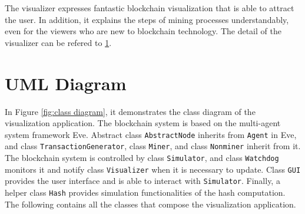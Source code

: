 The visualizer expresses fantastic blockchain visualization that is able to attract the user. In addition, it explains the steps of mining processes understandably, even for the viewers who are new to blockchain technology. The detail of the visualizer can be refered to \ref{}.

\section{UML Diagram}

In Figure \ref{fig:class diagram}, it demonstrates the class diagram of the visualization application. The blockchain system is based on the multi-agent system framework Eve. Abstract class \texttt{AbstractNode} inherits from \texttt{Agent} in Eve, and class \texttt{TransactionGenerator}, class \texttt{Miner}, and class \texttt{Nonminer} inherit from it. The blockchain system is controlled by class \texttt{Simulator}, and class \texttt{Watchdog} monitors it and notify class \texttt{Visualizer} when it is necessary to update. Class \texttt{GUI} provides the user interface and is able to interact with \texttt{Simulator}. Finally, a helper class \texttt{Hash} provides simulation functionalities of the hash computation. The following contains all the classes that compose the visualization application.

